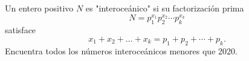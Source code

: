Un entero positivo $N$ es "interoceánico" si su factorización prima
\[ N=p_1^{x_1}p_2^{x_2}\cdots p_k^{x_k} \]
satisface
\[ x_1+x_2+\dots +x_k=p_1+p_2+\cdots +p_k. \]
Encuentra todos los números interoceánicos menores que 2020.
